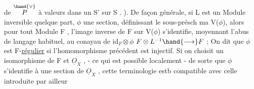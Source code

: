 de $\overset{\hand{\vee}}{P}$ \`a valeurs dans un S' sur S . ). \hand{\unsure{(}}De fa\c{c}on g\'en\'erale, si L est un
Module inversible quelque part, $\phi$ une section, d\'efinissant le sous-pr\'esch
ma V($\phi$), alors pour tout Module F , l'image inverse de F sur V($\phi$)
s'identifie, moyennant l'abus de langage habituel, au conayau de $\mathrm{id}_F\otimes\phi$
$F\otimes L^{-1} \hand{\longrightarrow} F$ ; On dit que $\phi$ est F-\uline{r\'egulier} si l'homomorphisme pr\'ec\'edent
est injectif. Si on choisit un isomorphisme de F et $\underline{O}_X$ , - ce qui
est possible localement - de sorte que $\phi$ s'identifie \`a une section de
$\underline{O}_X$ , cette terminologie estb compatible avec celle  introduite par ailleur

